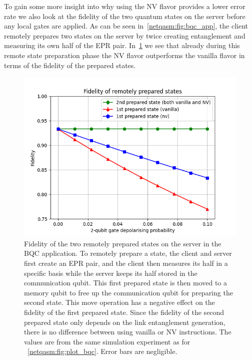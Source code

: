 To gain some more insight into why using the NV flavor provides a lower error rate we also look at the fidelity of the two quantum states on the server before any local gates are applied.
As can be seen in~\cref{netqasm:fig:bqc_app}, the client remotely prepares two states on the server by twice creating entanglement and measuring its own half of the EPR pair.
In~\cref{netqasm:fig:plot_bqc_fidelity} we see that already during this remote state preparation phase the NV flavor outperforms the vanilla flavor in terms of the fidelity of the prepared states.

\begin{figure}[t]
  \centering
  \includegraphics[scale=0.8]{figures/netqasm/plots/bqc_sweep_gate_noise_epr_fidelity.png}
  \caption{ Fidelity of the two remotely prepared states on the server in
        the BQC application. To remotely prepare a state, the client and server
        first create an EPR pair, and the client then measures its half in a
        specific basis while the server keeps its half stored in the
        communication qubit. This first prepared state is then moved to a memory
        qubit to free up the communication qubit for preparing the second state.
        This move operation has a negative effect on the fidelity of the first
        prepared state. Since the fidelity of the second prepared state only
        depends on the link entanglement generation, there is no difference
        between using vanilla or NV instructions. The values are from the same
        simulation experiment as for ~\cref{netqasm:fig:plot_bqc}. Error bars are
        negligible.}
  \label{netqasm:fig:plot_bqc_fidelity}
\end{figure}

